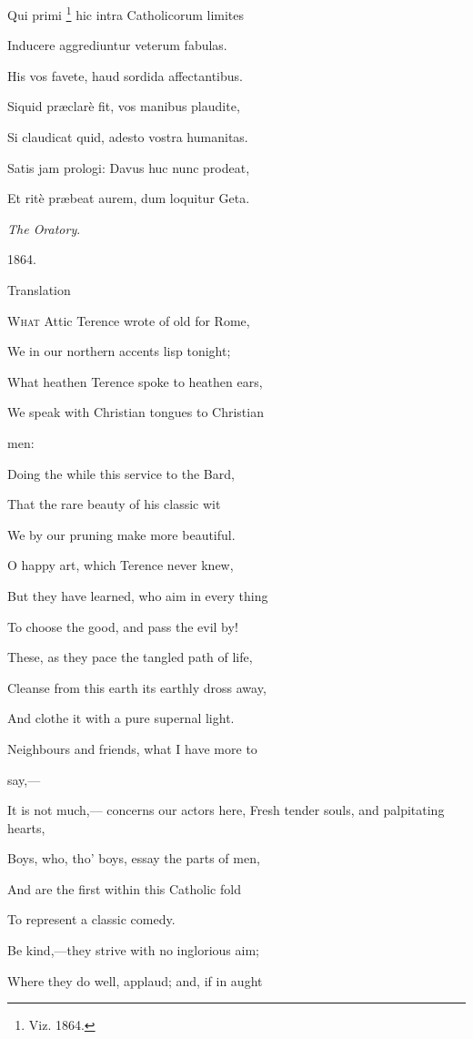 Qui primi \footnote{Viz. 1864.}
hic intra Catholicorum limites

Inducere aggrediuntur veterum fabulas.

His vos favete, haud sordida affectantibus.

Siquid præclarè fit, vos manibus plaudite,

Si claudicat quid, adesto vostra humanitas.

Satis jam prologi: Davus huc nunc prodeat,

Et ritè præbeat aurem, dum loquitur Geta.

\emph{The Oratory}.

1864.

Translation


W\textsc{hat} Attic Terence wrote of old for Rome,

We in our northern accents lisp tonight;

What heathen Terence spoke to heathen ears,

We speak with Christian tongues to Christian

men:

Doing the while this service to the Bard,

That the rare beauty of his classic wit

We by our pruning make more beautiful.

O happy art, which Terence never knew,

But they have learned, who aim in every thing

To choose the good, and pass the evil by!

These, as they pace the tangled path of life,

Cleanse from this earth its earthly dross away,

And clothe it with a pure supernal light.

Neighbours and friends, what I have more to

say,—

It is not much,— concerns our actors here, Fresh tender souls, and palpitating hearts,

Boys, who, tho' boys, essay the parts of men,

And are the first within this Catholic fold

To represent a classic comedy.

Be kind,—they strive with no inglorious aim;

Where they do well, applaud; and, if in aught

